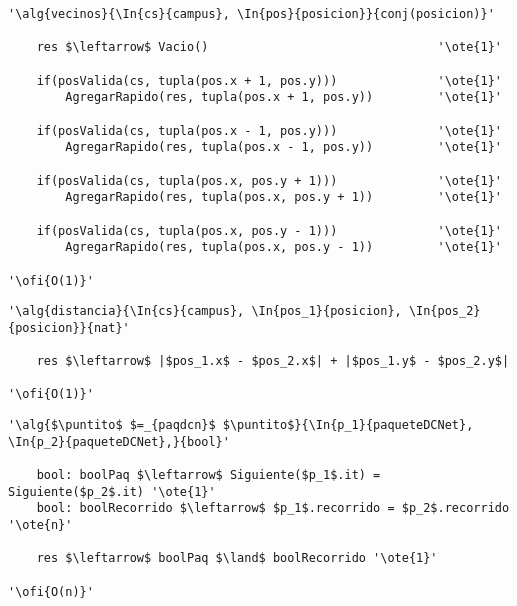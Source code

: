 \begin{lstlisting}[mathescape]
'\alg{vecinos}{\In{cs}{campus}, \In{pos}{posicion}}{conj(posicion)}'

	res $\leftarrow$ Vacio() 								'\ote{1}'

	if(posValida(cs, tupla(pos.x + 1, pos.y))) 				'\ote{1}'
		AgregarRapido(res, tupla(pos.x + 1, pos.y))			'\ote{1}'	

	if(posValida(cs, tupla(pos.x - 1, pos.y))) 				'\ote{1}'
		AgregarRapido(res, tupla(pos.x - 1, pos.y))			'\ote{1}'	

	if(posValida(cs, tupla(pos.x, pos.y + 1))) 				'\ote{1}'
		AgregarRapido(res, tupla(pos.x, pos.y + 1))			'\ote{1}'

	if(posValida(cs, tupla(pos.x, pos.y - 1)))				'\ote{1}'
		AgregarRapido(res, tupla(pos.x, pos.y - 1))			'\ote{1}'

'\ofi{O(1)}'
\end{lstlisting}

\begin{lstlisting}[mathescape]
'\alg{distancia}{\In{cs}{campus}, \In{pos_1}{posicion}, \In{pos_2}{posicion}}{nat}'
	
	res $\leftarrow$ |$pos_1.x$ - $pos_2.x$| + |$pos_1.y$ - $pos_2.y$|

'\ofi{O(1)}'
\end{lstlisting}

\begin{lstlisting}[mathescape]
'\alg{$\puntito$ $=_{paqdcn}$ $\puntito$}{\In{p_1}{paqueteDCNet}, \In{p_2}{paqueteDCNet},}{bool}'

	bool: boolPaq $\leftarrow$ Siguiente($p_1$.it) = Siguiente($p_2$.it) '\ote{1}'
	bool: boolRecorrido $\leftarrow$ $p_1$.recorrido = $p_2$.recorrido '\ote{n}'

	res $\leftarrow$ boolPaq $\land$ boolRecorrido '\ote{1}'

'\ofi{O(n)}'
\end{lstlisting}
